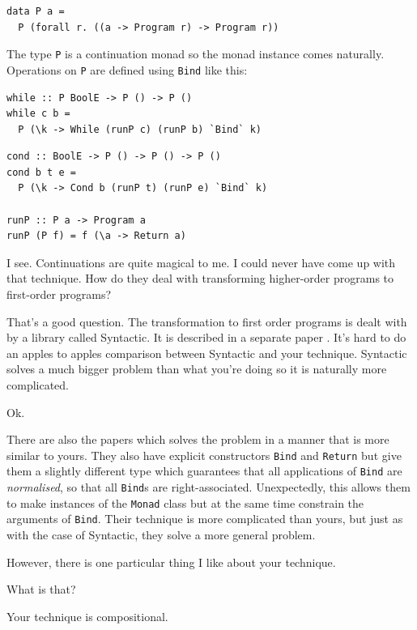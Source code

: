 \begin{small}
\begin{verbatim}
data P a =
  P (forall r. ((a -> Program r) -> Program r))
\end{verbatim}
\end{small}

\begin{dialogue}
\speak{\docname{}} The type \texttt{P} is a continuation monad so the
monad instance comes naturally. Operations on \texttt{P} are defined
using \texttt{Bind} like this:
\end{dialogue}

\begin{small}
\begin{verbatim}
while :: P BoolE -> P () -> P ()
while c b =
  P (\k -> While (runP c) (runP b) `Bind` k)
\end{verbatim}
\end{small}
\begin{small}
\begin{verbatim}
cond :: BoolE -> P () -> P () -> P ()
cond b t e =
  P (\k -> Cond b (runP t) (runP e) `Bind` k)

runP :: P a -> Program a
runP (P f) = f (\a -> Return a)
\end{verbatim}
\end{small}

\begin{dialogue}
\speak{\studname{}} I see. Continuations are quite magical to me. I
could never have come up with that technique. How do they deal with
transforming higher-order programs to first-order programs?

\speak{\docname{}} That's a good question. The transformation to first
order programs is dealt with by a library called Syntactic. It is
described in a separate paper . It's hard to do
an apples to apples comparison between Syntactic and your
technique. Syntactic solves a much bigger problem than what you're
doing so it is naturally more complicated.

\speak{\studname{}} Ok.

\speak{\docname{}} There are also the papers
\cite{Farmer,sculthorpe2013constrained} which solves
the problem in a manner that is more similar to yours. They also have explicit
constructors {\tt Bind} and {\tt Return} but give them a slightly different
type which guarantees that all applications of {\tt Bind} are {\em normalised},
so that all {\tt Bind}s are right-associated. Unexpectedly, this
allows them to make instances of the {\tt Monad} class but at the same time
constrain the arguments of {\tt Bind}.
Their technique is more complicated than yours, but just as with the
case of Syntactic, they solve a more general problem.

However, there is one particular thing I like about your technique.

\speak{\studname{}} What is that?

\speak{\docname{}} Your technique is compositional.

\end{dialogue}

